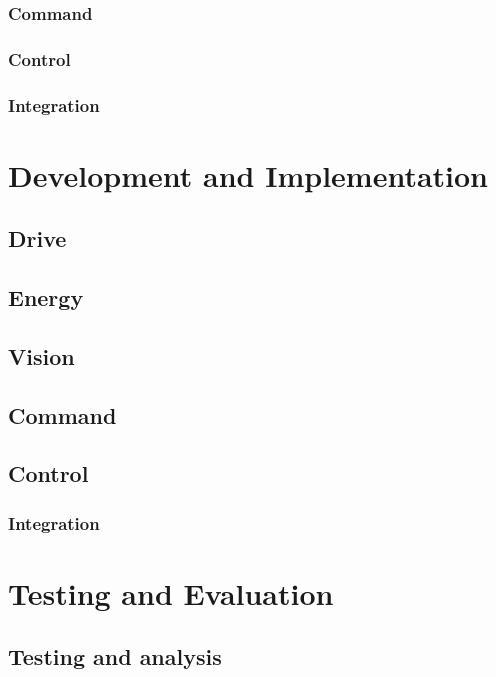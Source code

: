 \documentclass[10pt,twoside]{article}
\begin{document}
\subsubsection{Command}

\subsubsection{Control}

\subsubsection{Integration}

\section{Development and Implementation}

\subsection{Drive}

\subsection{Energy}

\subsection{Vision}

\subsection{Command}

\subsection{Control}

\subsubsection{Integration}

\section{Testing and Evaluation}
\subsection{Testing and analysis}
\end{document}
